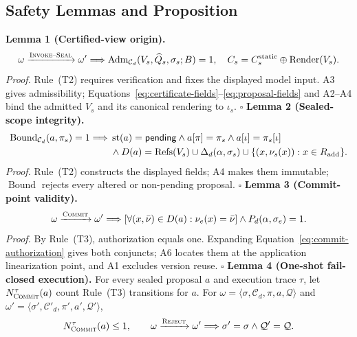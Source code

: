 \subsection{Safety Lemmas and Proposition}
\noindent\textbf{Lemma 1 (Certified-view origin).}
\begin{equation}
\omega\xrightarrow{\textsc{Invoke--Seal}}\omega'
\Longrightarrow
\operatorname{Adm}_{\mathcal C_d}(V_s,\widehat Q_s,\sigma_s;B)=1,
\quad C_s=C_s^{\mathrm{static}}\oplus\operatorname{Render}(V_s).
\label{eq:lemma-certified-origin}
\end{equation}
\emph{Proof.}
Rule~\textup{(T2)} requires verification and fixes the displayed model input. A3 gives admissibility; Equations~\eqref{eq:certificate-fields}--\eqref{eq:proposal-fields} and A2--A4 bind the admitted $V_s$ and its canonical rendering to $\iota_s$. \hfill$\square$
\noindent\textbf{Lemma 2 (Sealed-scope integrity).}
\begin{align}
\operatorname{Bound}_{\mathcal C_d}(a,\pi_s)=1
\Longrightarrow{}&
\operatorname{st}(a)=\mathsf{pending}
\land a[\pi]=\pi_s
\land a[\iota]=\pi_s[\iota] \notag\\
&\land D(a)=\operatorname{Refs}(V_s)\cup\Delta_d(\alpha,\sigma_s)
\cup\{(x,\nu_s(x)):x\in R_{\mathrm{add}}\}.
\label{eq:lemma-sealed-scope}
\end{align}
\emph{Proof.}
Rule~\textup{(T2)} constructs the displayed fields; A4 makes them immutable; $\operatorname{Bound}$ rejects every altered or non-pending proposal. \hfill$\square$
\noindent\textbf{Lemma 3 (Commit-point validity).}
\begin{equation}
\omega\xrightarrow{\textsc{Commit}}\omega'
\Longrightarrow
\left[\forall(x,\bar\nu)\in D(a):\nu_e(x)=\bar\nu\right]
\land P_d(\alpha,\sigma_e)=1.
\label{eq:lemma-commit-validity}
\end{equation}
\emph{Proof.}
By Rule~\textup{(T3)}, authorization equals one. Expanding Equation~\eqref{eq:commit-authorization} gives both conjuncts; A6 locates them at the application linearization point, and A1 excludes version reuse. \hfill$\square$
\noindent\textbf{Lemma 4 (One-shot fail-closed execution).}
For every sealed proposal $a$ and execution trace $\tau$, let
$N^\tau_{\textsc{Commit}}(a)$ count Rule~\textup{(T3)} transitions for $a$.
For
$\omega=\langle\sigma,\mathcal C_d,\pi,a,\mathcal Q\rangle$ and
$\omega'=\langle\sigma',\mathcal C'_d,\pi',a',\mathcal Q'\rangle$,
\begin{equation}
N^{\tau}_{\textsc{Commit}}(a)\le1,\qquad
\omega\xrightarrow{\textsc{Reject}}\omega'
\Longrightarrow \sigma'=\sigma\land\mathcal Q'=\mathcal Q.
\label{eq:lemma-one-shot}
\end{equation}
